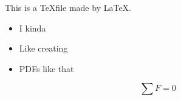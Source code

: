 \documentclass{article}
\begin{document}
This is a \TeX file made by \LaTeX.
\begin{itemize}
    \item I kinda
    \item Like creating
    \item PDFs like that
\end{itemize}

\begin{equation}
    \sum F = 0
\end{equation}
\end{document}
